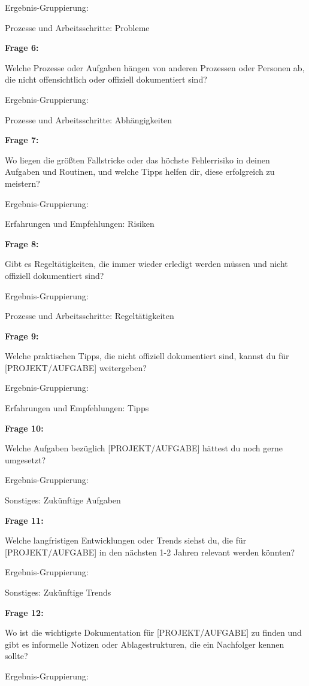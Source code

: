 \documentclass[
  10pt,
  ngerman,
  a4paper,
  toc=graduated,
  numbers=noenddot,
  headings=standardclasses,
  nonumberlist
]{scrartcl}
\begin{document}
Ergebnis-Gruppierung:

Prozesse und Arbeitsschritte: Probleme

\textbf{Frage 6:}

Welche Prozesse oder Aufgaben hängen von anderen Prozessen oder Personen ab, die nicht offensichtlich oder offiziell dokumentiert sind?

Ergebnis-Gruppierung:

Prozesse und Arbeitsschritte: Abhängigkeiten

\textbf{Frage 7:}

Wo liegen die größten Fallstricke oder das höchste Fehlerrisiko in deinen Aufgaben und Routinen, und welche Tipps helfen dir, diese erfolgreich zu meistern?

Ergebnis-Gruppierung:

Erfahrungen und Empfehlungen: Risiken

\textbf{Frage 8:}

Gibt es Regeltätigkeiten, die immer wieder erledigt werden müssen und nicht offiziell dokumentiert sind?

Ergebnis-Gruppierung:

Prozesse und Arbeitsschritte: Regeltätigkeiten

\textbf{Frage 9:}

Welche praktischen Tipps, die nicht offiziell dokumentiert sind, kannst du für [PROJEKT/AUFGABE] weitergeben?

Ergebnis-Gruppierung:

Erfahrungen und Empfehlungen: Tipps

\textbf{Frage 10:}

Welche Aufgaben bezüglich [PROJEKT/AUFGABE] hättest du noch gerne umgesetzt?

Ergebnis-Gruppierung:

Sonstiges: Zukünftige Aufgaben

\textbf{Frage 11:}

Welche langfristigen Entwicklungen oder Trends siehst du, die für [PROJEKT/AUFGABE] in den nächsten 1-2 Jahren relevant werden könnten?

Ergebnis-Gruppierung:

Sonstiges: Zukünftige Trends

\textbf{Frage 12:}

Wo ist die wichtigste Dokumentation für [PROJEKT/AUFGABE] zu finden und gibt es informelle Notizen oder Ablagestrukturen, die ein Nachfolger kennen sollte?

Ergebnis-Gruppierung:
\end{document}
